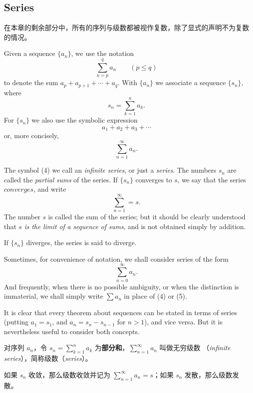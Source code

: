 \documentclass[../poma-notes.tex]{subfiles}
\begin{document}
\subsection*{Series}

在本章的剩余部分中，所有的序列与级数都被视作复数，除了显式的声明不为复数的情况。

\begin{definition}
  Given a sequence $\{a_n\}$, we use the notation
  \[ \sum_{n=p}^{q} a_n \qquad (p \le q) \]
  to denote the sum $ a_p + a_{p+1} + \cdots + a_q$. With $\{a_n\}$ we associate a sequence $\{s_n\}$, where
  \[ s_n = \sum_{k=1}^{n} a_k. \]
  For $\{s_n\}$ we also use the symbolic expression
  \[ a_1 + a_2 + a_3 + \cdots \]
  or, more concisely,
  \begin{equation}
    \sum_{n=1}^{\infty} a_n.
  \end{equation}

  The symbol (4) we call an \textit{infinite series}, or just a \textit{series}. The numbers $s_n$ are called
  the \textit{partial sums} of the series. If $\{s_n\}$ converges to $s$, we say that the series $converges$,
  and write
  \[ \sum_{n=1}^{\infty} = s. \]
  The number $s$ is called the sum of the series; but it should be clearly understood that \textit{$s$ is the
    limit of a sequence of sums}, and is not obtained simply by addition.

  If $\{s_n\}$ diverges, the series is said to diverge.

  Sometimes, for convenience of notation, we shall consider series of the form
  \begin{equation}
    \sum_{n=0}^{\infty} a_n.
  \end{equation}
  And frequently, when there is no possible ambiguity, or when the distinction is immaterial, we shall simply
  write $\sum a_n$ in place of (4) or (5).

  It is clear that every theorem about sequences can be stated in terms of series (putting $a_1 = s_1$, and
  $a_n = s_n - s_{n-1}$ for $n > 1$), and vice versa. But it is nevertheless useful to consider both concepts.
\end{definition}


\begin{anote}\mbox{}\par
  对序列 $a_n$，令 $s_n = \sum_{k=1}^{n} a_k$ 为\textbf{部分和}，$\sum_{n=1}^{\infty} a_n$ 叫做无穷级数
  （\textit{infinite series}），简称级数（\textit{series}）。

  如果 $s_n$ 收敛，那么级数收敛并记为 $\sum_{n=1}^{\infty} a_n = s$；如果 $s_n$ 发散，那么级数发散。
\end{anote}
\end{document}
